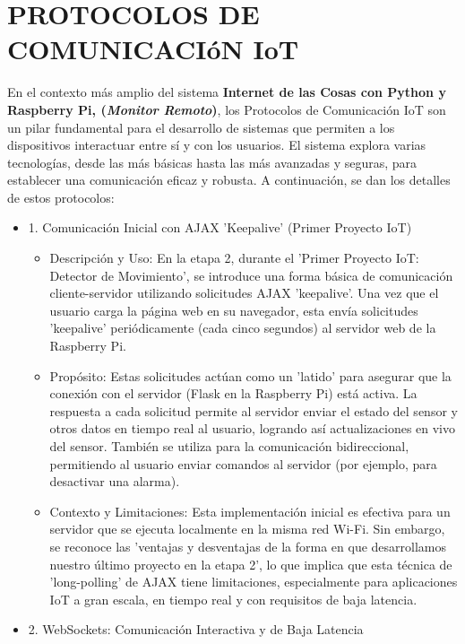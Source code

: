\documentclass{report}
\begin{document}
\chapter{PROTOCOLOS DE COMUNICACIóN IoT}
En el contexto más amplio del sistema \textbf{Internet de las Cosas con Python y Raspberry Pi, (\textit{Monitor Remoto})}, los 
Protocolos de Comunicación IoT son un pilar fundamental para el desarrollo de sistemas que permiten a los dispositivos interactuar 
entre sí y con los usuarios. El sistema explora varias tecnologías, desde las más básicas hasta las más avanzadas y seguras, 
para establecer una comunicación eficaz y robusta.
A continuación, se dan los detalles de estos protocolos:
\begin{itemize}
    \item 1. Comunicación Inicial con AJAX 'Keepalive' (Primer Proyecto IoT)
    \begin{itemize}
        \item Descripción y Uso: En la etapa 2, durante el 'Primer Proyecto IoT: Detector de Movimiento', se introduce una forma 
        básica de comunicación cliente-servidor utilizando solicitudes AJAX 'keepalive'. Una vez que el usuario carga la página 
        web en su navegador, esta envía solicitudes 'keepalive' periódicamente (cada cinco segundos) al servidor web de la Raspberry Pi.
        \item Propósito: Estas solicitudes actúan como un 'latido' para asegurar que la conexión con el servidor 
        (Flask en la Raspberry Pi) está activa. La respuesta a cada solicitud permite al servidor enviar el estado del sensor y otros 
        datos en tiempo real al usuario, logrando así actualizaciones en vivo del sensor. También se utiliza para la comunicación 
        bidireccional, permitiendo al usuario enviar comandos al servidor (por ejemplo, para desactivar una alarma).
        \item Contexto y Limitaciones: Esta implementación inicial es efectiva para un servidor que se ejecuta localmente en la misma 
        red Wi-Fi. Sin embargo, se reconoce las 'ventajas y desventajas de la forma en que desarrollamos nuestro último proyecto 
        en la etapa 2', lo que implica que esta técnica de 'long-polling' de AJAX tiene limitaciones, especialmente para aplicaciones 
        IoT a gran escala, en tiempo real y con requisitos de baja latencia.
    \end{itemize}
    \item 2. WebSockets: Comunicación Interactiva y de Baja Latencia

\end{itemize}
\end{document}
